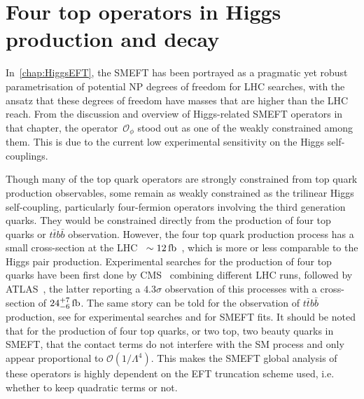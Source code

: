 

\chapter{ Four top operators in Higgs production and decay}\label{chap:4topSingleHiggs}
%
\par In~\autoref{chap:HiggsEFT}, the SMEFT has been portrayed as a pragmatic yet robust parametrisation of potential NP degrees of freedom for LHC searches, with the ansatz that these degrees of freedom have masses that are higher than the LHC reach. From the discussion and overview of Higgs-related SMEFT operators in that chapter, the operator~$ \mathcal O _{\phi}$ stood out as one of the weakly constrained among them. This is due to the current low experimental sensitivity on the Higgs self-couplings.
\par 
Though many of the top quark operators are strongly constrained from top quark production observables, some remain as weakly constrained as the trilinear Higgs self-coupling, particularly four-fermion operators involving the third generation quarks. They would be constrained directly from the production of four top quarks or $t \bar t b \bar b$ observation. However,  the four top quark production process has a small cross-section at the LHC~ $\sim12\, \femtobarn$~\cite{Frederix:2017wme}, which is more or less comparable to the Higgs pair production. Experimental searches for the production of four top quarks have been first done by CMS~\cite{Sirunyan:2019nxl} combining different LHC runs, followed by ATLAS~\cite{Aad:2020klt}, the latter reporting a $4.3 \sigma$ observation of this processes with a cross-section of $24^{+7}_{-6}\,\femtobarn$. The same story can be told for the observation of $t\bar{t}b\bar{b}$ production, see \cite{Sirunyan:2020kgar, ATLAS:2018gug} for experimental searches and \cite{DHondt:2018cww, Hartland:2019bjb} for SMEFT fits. It should be noted that for the production of four top quarks, or two top, two beauty quarks in SMEFT, that the contact terms do not interfere with the SM process and only appear proportional to $\mathcal{O}(1/\Lambda^4)$. This makes the SMEFT global analysis of these operators is highly dependent on the EFT truncation scheme used, i.e. whether to keep quadratic terms or not. 
